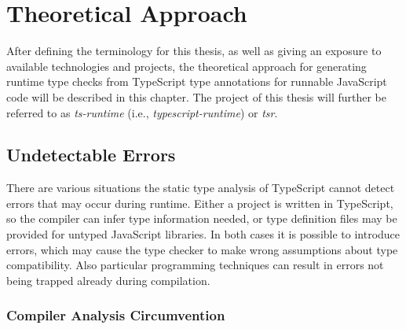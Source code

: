 \chapter{Theoretical Approach}
\label{cha:theoretical-approach}

After defining the terminology for this thesis, as well as giving an exposure to available technologies and projects, the theoretical approach for generating runtime type checks from TypeScript type annotations for runnable JavaScript code will be described in this chapter. The project of this thesis will further be referred to as \emph{ts-runtime} (i.e., \emph{typescript-runtime}) or \emph{tsr}.

\section{Undetectable Errors}
\label{sec:undetectable-errors}
%
%

There are various situations the static type analysis of TypeScript cannot detect errors that may occur during runtime. Either a project is written in TypeScript, so the compiler can infer type information needed, or type definition files may be provided for untyped JavaScript libraries. In both cases it is possible to introduce errors, which may cause the type checker to make wrong assumptions about type compatibility. Also particular programming techniques can result in errors not being trapped already during compilation.

\subsection{Compiler Analysis Circumvention}

